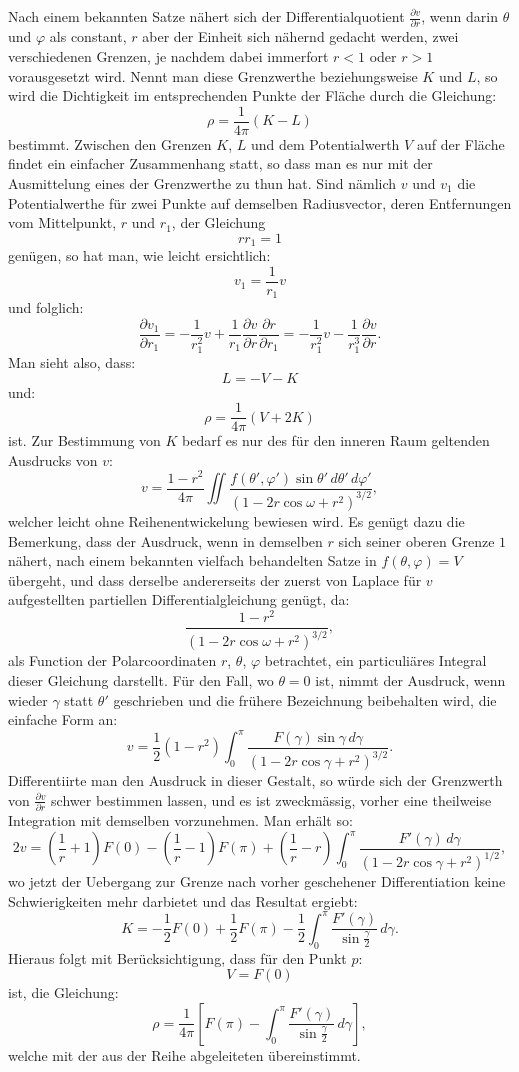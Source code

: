 \documentclass[11pt]{article}
\newcommand{\dd}{\,d}
\begin{document}
Nach einem bekannten Satze nähert sich der Differentialquotient $\frac{\partial v}{\partial r}$, wenn darin $\theta$ und $\varphi$ als constant, $r$ aber der Einheit sich nähernd gedacht werden, zwei verschiedenen Grenzen, je nachdem dabei immerfort $r<1$ oder $r>1$ vorausgesetzt wird. Nennt man diese Grenzwerthe beziehungsweise $K$ und $L$, so wird die Dichtigkeit im entsprechenden Punkte der Fläche durch die Gleichung:
\[
 \rho=\frac1{4\pi}(K-L)
\]
bestimmt. Zwischen den Grenzen $K$, $L$ und dem Potentialwerth $V$ auf der Fläche findet ein einfacher Zusammenhang statt, so dass man es nur mit der Ausmittelung eines der Grenzwerthe zu thun hat. Sind nämlich $v$ und $v_1$ die Potentialwerthe für zwei Punkte auf demselben Radiusvector, deren Entfernungen vom Mittelpunkt, $r$ und $r_1$, der Gleichung
\[
 rr_1=1
\]
genügen, so hat man, wie leicht ersichtlich:
\[
 v_1=\frac1{r_1}v
\]
und folglich:
\[
 \frac{\partial v_1}{\partial r_1}=-\frac1{r_1^2}v+\frac1{r_1}\frac{\partial v}{\partial r}\frac{\partial r}{\partial r_1}
 =-\frac1{r_1^2}v-\frac1{r_1^3}\frac{\partial v}{\partial r}.
\]
Man sieht also, dass:
\[
 L=-V-K
\]
und:
\[
 \rho=\frac1{4\pi}(V+2K)
\]
ist. Zur Bestimmung von $K$ bedarf es nur des für den inneren Raum geltenden Ausdrucks von $v$:
\[
 v=\frac{1-r^2}{4\pi}\iint\frac{f(\theta',\varphi')\sin\theta'\dd\theta'\dd\varphi'}{(1-2r\cos\omega+r^2)^{3/2}},
\]
welcher leicht ohne Reihenentwickelung bewiesen wird. Es genügt dazu die Bemerkung, dass der Ausdruck, wenn in demselben $r$ sich seiner oberen Grenze $1$ nähert, nach einem bekannten vielfach behandelten Satze in $f(\theta,\varphi)=V$ übergeht, und dass derselbe andererseits der zuerst von Laplace für $v$ aufgestellten partiellen Differentialgleichung genügt, da:
\[
 \frac{1-r^2}{(1-2r\cos\omega+r^2)^{3/2}},
\]
als Function der Polarcoordinaten $r$, $\theta$, $\varphi$ betrachtet, ein particuliäres Integral dieser Gleichung darstellt. Für den Fall, wo $\theta=0$ ist, nimmt der Ausdruck, wenn wieder $\gamma$ statt $\theta'$ geschrieben und die frühere Bezeichnung beibehalten wird, die einfache Form an:
\[
 v=\frac12(1-r^2)\int_0^\pi \frac{F(\gamma)\sin\gamma\dd\gamma}{(1-2r\cos\gamma+r^2)^{3/2}}.
\]
Differentiirte man den Ausdruck in dieser Gestalt, so würde sich der Grenzwerth von $\frac{\partial v}{\partial r}$ schwer bestimmen lassen, und es ist zweckmässig, vorher eine theilweise Integration mit demselben vorzunehmen. Man erhält so:
\[
 2v=\left(\frac1r+1\right)F(0)-\left(\frac1r-1\right)F(\pi)
 +\left(\frac1r-r\right)\int_0^\pi\frac{F'(\gamma)\dd\gamma}{(1-2r\cos\gamma+r^2)^{1/2}},
\]
wo jetzt der Uebergang zur Grenze nach vorher geschehener Differentiation keine Schwierigkeiten mehr darbietet und das Resultat ergiebt:
\[
 K=-\frac12F(0)+\frac12F(\pi)-\frac12\int_0^\pi\frac{F'(\gamma)}{\sin\frac{\gamma}{2}}\dd\gamma.
\]
Hieraus folgt mit Berücksichtigung, dass für den Punkt $p$:
\[
 V=F(0)
\]
ist, die Gleichung:
\[
 \rho=\frac1{4\pi}\left[F(\pi)-\int_0^\pi\frac{F'(\gamma)}{\sin\frac{\gamma}{2}}\dd\gamma\right],
\]
welche mit der aus der Reihe abgeleiteten übereinstimmt.
\end{document}
